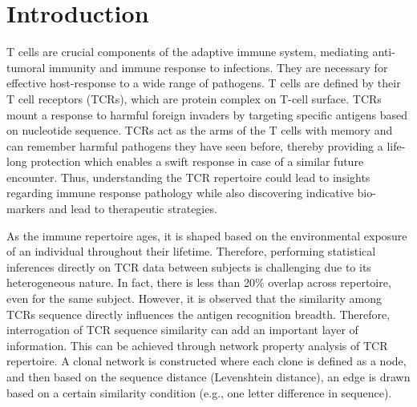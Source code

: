 \chapter{Introduction}


T cells are crucial components of the adaptive immune system, mediating anti-tumoral immunity and immune response to infections. They are necessary for effective host-response to a wide range of pathogens. T cells are defined by their T cell receptors (TCRs), which are protein complex on T-cell surface. TCRs mount a response to harmful foreign invaders by targeting specific antigens based on nucleotide sequence. TCRs act as the arms of the T cells with memory and can remember harmful pathogens they have seen before, thereby providing a life-long protection which enables a swift response in case of a similar future encounter. Thus, understanding the TCR repertoire could lead to insights regarding immune response pathology while also discovering indicative bio-markers and lead to therapeutic strategies.\par

As the immune repertoire ages, it is shaped based on the environmental exposure of an individual throughout their lifetime. Therefore, performing statistical inferences directly on TCR data between subjects is challenging due to its heterogeneous nature. In fact, there is less than 20\% overlap across repertoire, even for the same subject. However, it is observed that the similarity among TCRs sequence directly influences the antigen recognition breadth. Therefore, interrogation of TCR sequence similarity can add an important layer of information. This can be achieved through network property analysis of TCR repertoire. A clonal network is constructed where each clone is defined as a node, and then based on the sequence distance (Levenshtein distance), an edge is drawn based on a certain similarity condition (e.g., one letter difference in sequence).\par

